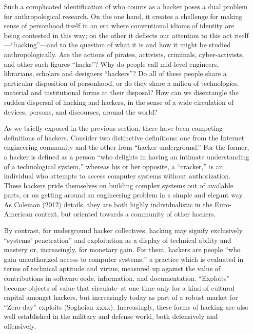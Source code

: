 \documentclass[10pt,letter,oneside]{scrartcl}
\begin{document}
Such a complicated identification of who counts as a hacker poses a dual
problem for anthropological research.  On the one hand, it creates a challenge
for making sense of personhood itself in an era where conventional idioms of
identity are being contested in this way; on the other it deflects our
attention to this act itself---``hacking''---and to the question of what it is
and how it might be studied anthropologically.  Are the actions of pirates,
activists, criminals, cyber-activists, and other such figures ``hacks''?  Why
do people call mid-level engineers, librarians, scholars and designers
``hackers''?  Do all of these people share a particular disposition of
personhood, or do they share a milieu of technologies, material and
institutional forms at their disposal?  How can we disentangle the sudden
dispersal of hacking and hackers, in the sense of a wide circulation of
devices, persons, and discourses, around the world?

As we briefly exposed in the previous section, there have been competing
definitions of hackers.  Consider two distinctive definitions: one from the
Internet engineering community and the other from ``hacker underground.''  For
the former, a hacker is defined as a person ``who delights in having an
intimate understanding of a technological system,'' whereas his or her
opposite, a ``cracker,'' is an individual who attempts to access computer
systems without authorization.  These hackers pride themselves on building
complex systems out of available parts, or on getting around an engineering
problem in a simple and elegant way.  As Coleman (2012) details, they are both
highly individualistic in the Euro-American context, but oriented towards a
community of other hackers.

By contrast, for underground hacker collectives, hacking may signify
exclusively ``systems' penetration'' and exploitation as a display of technical
ability and mastery or, increasingly, for monetary gain.  For them, hackers are
people ``who gain unauthorized access to computer systems,'' a practice which
is evaluated in terms of technical aptitude and virtue, measured up against the
value of contributions in software code, information, and documentation.
``Exploits'' become objects of value that circulate--at one time only for a
kind of cultural capital amongst hackers, but increasingly today as part of a
robust market for ``Zero-day'' exploits (Soghoian xxxx).  Increasingly, these
forms of hacking are also well established in the military and defense world,
both defensively and offensively.
\end{document}
